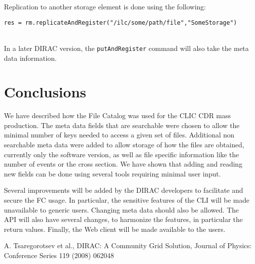 \documentclass[11pt,a4paper]{scrartcl}
\begin{document}
Replication to another storage element is done using the following:
\begin{lstlisting}
res = rm.replicateAndRegister("/ilc/some/path/file","SomeStorage")
\end{lstlisting}

~\\

In a later DIRAC version, the \lstinline|putAndRegister| command will also take
the meta data information.

\section{Conclusions}
We have described how the File Catalog was used for the CLIC CDR mass
production. The meta data fields that are searchable were chosen to allow the
minimal number of keys needed to access a given set of files. Additional non
searchable meta data were added to allow storage of how the files are obtained,
currently only the software version, as well as file specific information like
the number of events or the cross section. We have shown that adding and
reading new fields can be done using several tools requiring minimal user input.

Several improvements will be added by the DIRAC developers to facilitate and
secure the FC usage. In particular, the sensitive features of the CLI will be
made unavailable to generic users. Changing meta data should also be allowed.
The API will also have several changes, to harmonize the features, in particular
the return values. Finally, the Web client will be made available to the users.

\begin{thebibliography}{9}
 A. Tsaregorotsev et al., DIRAC: A Community Grid Solution,
Journal of Physics: Conference Series 119 (2008) 062048
\end{thebibliography}
\end{document}
